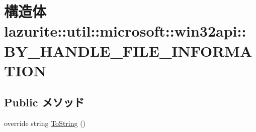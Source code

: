 \hypertarget{structlazurite_1_1util_1_1microsoft_1_1win32api_1_1_b_y___h_a_n_d_l_e___f_i_l_e___i_n_f_o_r_m_a_t_i_o_n}{
\section{構造体 lazurite::util::microsoft::win32api::BY\_\-HANDLE\_\-FILE\_\-INFORMATION}
\label{structlazurite_1_1util_1_1microsoft_1_1win32api_1_1_b_y___h_a_n_d_l_e___f_i_l_e___i_n_f_o_r_m_a_t_i_o_n}
}
\subsection*{Public メソッド}
\begin{DoxyCompactItemize}
\item 
override string \hyperlink{structlazurite_1_1util_1_1microsoft_1_1win32api_1_1_b_y___h_a_n_d_l_e___f_i_l_e___i_n_f_o_r_m_a_t_i_o_n_a1c9720e30b1c2d05921eafbb909130ae}{ToString} ()
\end{DoxyCompactItemize}
